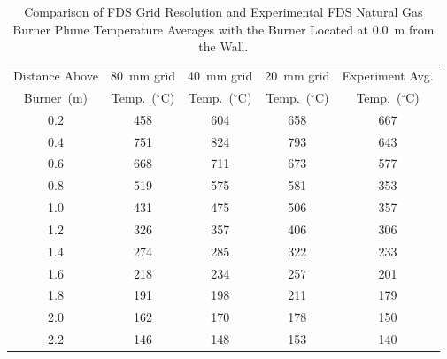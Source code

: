 \documentclass[twoside]{uocthesis}
\begin{document}
\begin{table}
	\small
	\centering
	\begin{tabular}{|c|c|c|c|c|}
		\hline Distance Above  & 80~mm grid      & 40~mm grid     & 20~mm grid 		& Experiment Avg. \\
		Burner~(m)	   & Temp.~($^{\circ}$C) & Temp.~($^{\circ}$C) & Temp.~($^{\circ}$C)  & Temp.~($^{\circ}$C)	\\ \hline
		\hline 0.2 			   & 458						& 604					& 658 			& 667 	\\
		\hline 0.4			   & 751					   	& 824					& 793			& 643 	\\
		\hline 0.6			   & 668						& 711					& 673			& 577 	\\
		\hline 0.8			   & 519						& 575					& 581			& 353	\\
		\hline 1.0			   & 431						& 475 					& 506			& 357	\\
		\hline 1.2			   & 326						& 357 					& 406			& 306	\\
		\hline 1.4			   & 274						& 285 					& 322			& 233	\\
		\hline 1.6			   & 218						& 234 					& 257			& 201	\\
		\hline 1.8			   & 191						& 198 					& 211			& 179	\\
		\hline 2.0			   & 162						& 170 					& 178			& 150	\\
		\hline 2.2			   & 146						& 148 					& 153			& 140	\\
		\hline
	\end{tabular}
	\caption[Comparison of FDS Grid Resolution and Experimental FDS Natural Gas Burner Plume Temperatures, 0.0~m from the Wall.]{Comparison of FDS Grid Resolution and Experimental FDS Natural Gas Burner Plume Temperature Averages with the Burner Located at 0.0~m from the Wall.}
	\label{tab:FDSRI_Exp_Plume0d}
\end{table}
\end{document}
